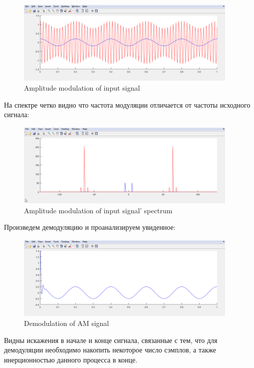 \documentclass[a4paper,14pt]{extarticle}
\begin{document}
\begin{figure}[H]
\centering
\includegraphics[width=0.95\textwidth]{am}
\captionsetup{justification=centering,margin=1.0 cm}
\caption{Amplitude modulation of input signal}
\label{any}
\end{figure}
На спектре четко видно что частота модуляции отличается от частоты исходного сигнала:

\begin{figure}[H]
\centering
\includegraphics[width=0.95\textwidth]{am_sp}
\captionsetup{justification=centering,margin=1.0 cm}
\caption{Amplitude modulation of input signal' spectrum}
\label{any}
\end{figure}

Произведем демодуляцию и проанализируем увиденное:

\begin{figure}[H]
\centering
\includegraphics[width=0.95\textwidth]{am_dm}
\captionsetup{justification=centering,margin=1.0cm}
\caption{Demodulation of AM signal}
\label{sig}
\end{figure}
Видны искажения в начале и конце сигнала, связанные с тем, что для демодуляции необходимо накопить некоторое число сэмплов, а также инерционностью данного процесса в конце.
\end{document}
